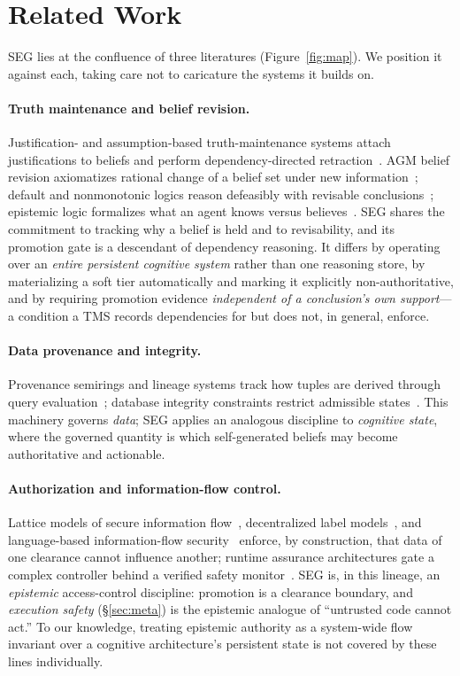 \documentclass[11pt]{article}
\theoremstyle{plain}
\theoremstyle{definition}
\begin{document}
\section{Related Work}
\label{sec:related}

SEG lies at the confluence of three literatures (Figure~\ref{fig:map}). We
position it against each, taking care not to caricature the systems it builds on.

\paragraph{Truth maintenance and belief revision.} Justification- and
assumption-based truth-maintenance systems attach justifications to beliefs and
perform dependency-directed retraction~\cite{doyle1979,dekleer1986}. AGM belief
revision axiomatizes rational change of a belief set under new
information~\cite{agm1985}; default and nonmonotonic logics reason defeasibly with
revisable conclusions~\cite{reiter1980}; epistemic logic formalizes what an agent
knows versus believes~\cite{fhmv1995}. SEG shares the commitment to tracking why a
belief is held and to revisability, and its promotion gate is a descendant of
dependency reasoning. It differs by operating over an \emph{entire persistent
cognitive system} rather than one reasoning store, by materializing a soft tier
automatically and marking it explicitly non-authoritative, and by requiring
promotion evidence \emph{independent of a conclusion's own support}---a condition
a TMS records dependencies for but does not, in general, enforce.

\paragraph{Data provenance and integrity.} Provenance semirings and lineage
systems track how tuples are derived through query
evaluation~\cite{green2007,cheney2009}; database integrity constraints restrict
admissible states~\cite{ahv1995}. This machinery governs \emph{data}; SEG applies
an analogous discipline to \emph{cognitive state}, where the governed quantity is
which self-generated beliefs may become authoritative and actionable.

\paragraph{Authorization and information-flow control.} Lattice models of secure
information flow~\cite{denning1976}, decentralized label models~\cite{myers1997},
and language-based information-flow security~\cite{sabelfeld2003} enforce, by
construction, that data of one clearance cannot influence another; runtime
assurance architectures gate a complex controller behind a verified safety
monitor~\cite{sha2001}. SEG is, in this lineage, an \emph{epistemic} access-control
discipline: promotion is a clearance boundary, and \emph{execution safety}
(\S\ref{sec:meta}) is the epistemic analogue of ``untrusted code cannot act.''
To our knowledge, treating epistemic authority as a system-wide flow invariant
over a cognitive architecture's persistent state is not covered by these lines
individually.
\end{document}
